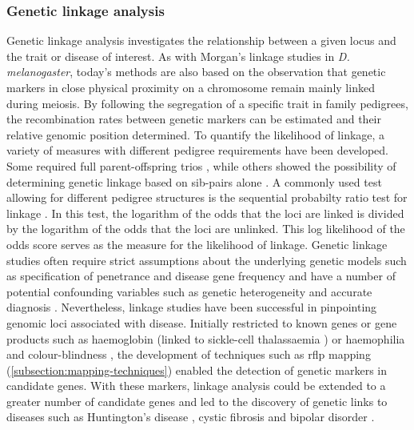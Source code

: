 \subsubsection{Genetic linkage analysis}
Genetic linkage analysis investigates the relationship between a given locus and the trait or disease of interest.  As with Morgan's linkage studies in \textit{D. melanogaster}, today's methods are also based on the observation that genetic markers in close physical proximity on a chromosome remain mainly linked during meiosis. By following the segregation of a specific trait in family pedigrees, the recombination rates between genetic markers can be estimated and their relative genomic position determined. To quantify the likelihood of linkage, a variety of measures with different pedigree requirements have been developed. Some required full parent-offspring trios \citep{Bernstein1930,Haldane1934}, while others showed the possibility of determining genetic linkage based on sib-pairs alone \citep{Penrose1935}. A commonly used test allowing for different pedigree structures is the sequential probabilty ratio test for linkage \citep{Morton1955,Pulst1999}. In this test, the logarithm of the odds that the loci are linked is divided by the logarithm of the odds that the loci are unlinked. This log likelihood of the odds score serves as the measure for the likelihood of linkage. Genetic linkage studies often require strict assumptions about the underlying genetic models such as specification of penetrance and disease gene frequency \citep{Morton1955,Pulst1999} and have a number of potential confounding variables such as genetic heterogeneity and accurate diagnosis \citep{Bird1993}. Nevertheless, linkage studies have been successful in pinpointing genomic loci associated with disease.  Initially restricted to known genes or gene products such as haemoglobin (linked to sickle-cell thalassaemia \citep{Ingram1959}) or haemophilia and colour-blindness \citep{Haldane1947}, the development of techniques such as \gls{rflp} mapping (\cref{subsection:mapping-techniques}) enabled the detection of genetic markers in candidate genes. With these markers, linkage analysis could be extended to a greater number of candidate genes and  led to the discovery of genetic links to diseases such as Huntington's disease \citep{Gusella1983}, cystic fibrosis \citep{Kerem1989} and bipolar disorder \citep{Baron1987}. 

